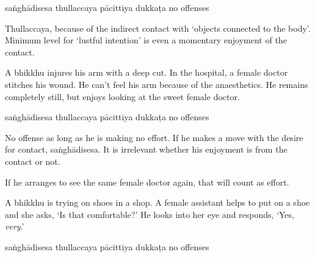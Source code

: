 \begin{exam}{\autoExamName}
\begin{problem*}
\begin{parts}
    \bigskip

    \begin{answers}{5}
      \bChoices
       saṅghādisesa\eAns
       thullaccaya\eAns
       pācittiya\eAns
       dukkaṭa\eAns
       no offenses\eAns
      \eChoices
    \end{answers}

    \begin{solution}
      Thullaccaya, because of the indirect contact with `objects connected to the body'.
      Minimum level for `lustful intention' is even a momentary enjoyment of the contact.
    \end{solution}

    \bigskip

  \item A bhikkhu injures his arm with a deep cut. In the hospital, a female
    doctor stitches his wound. He can't feel his arm because of the
    anaesthetics. He remains completely still, but enjoys looking at the sweet female doctor.

    \bigskip

    \begin{answers}{5}
      \bChoices
       saṅghādisesa\eAns
       thullaccaya\eAns
       pācittiya\eAns
       dukkaṭa\eAns
       no offenses\eAns
      \eChoices
    \end{answers}

    \begin{solution}
      No offense as long as he is making no effort.
      If he makes a move with the desire for contact, saṅghādisesa.
      It is irrelevant whether his enjoyment is from the contact or not.

      If he arranges to see the same female doctor again, that will count as effort.
    \end{solution}

    \bigskip

  \item A bhikkhu is trying on shoes in a shop. A female assistant helps to put
    on a shoe and she asks, `Is that comfortable?' He looks into her eye and
    responds, `Yes, \textit{very}.'

    \bigskip

    \begin{answers}{5}
      \bChoices
       saṅghādisesa\eAns
       thullaccaya\eAns
       pācittiya\eAns
       dukkaṭa\eAns
       no offenses\eAns
      \eChoices
    \end{answers}


\end{parts}
\end{problem*}
\end{exam}
